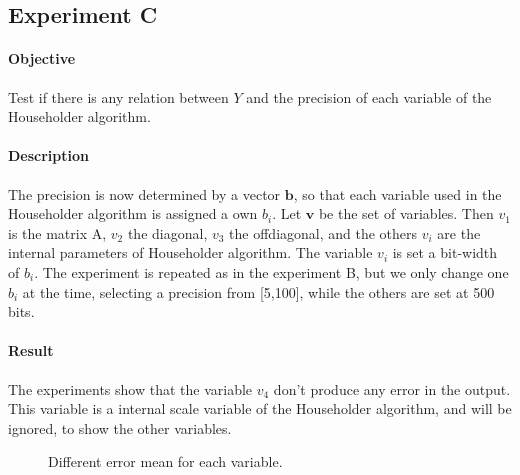 \documentclass[11pt,a4paper]{article}
\newcommand*\V[1]{ \boldsymbol{#1}}
\begin{document}
\newpage
\subsection*{Experiment C}

\paragraph{Objective}
Test if there is any relation between $Y$ and the precision of each variable of 
the Householder algorithm.

\paragraph{Description}
The precision is now determined by a vector $\V b$, so that each variable used 
in the Householder algorithm is assigned a own $b_i$. Let $\V v$ be the set of
variables. Then $v_1$ is the matrix A, $v_2$ the diagonal, $v_3$ the 
offdiagonal, and the others $v_i$ are the internal parameters of Householder 
algorithm. The variable $v_i$ is set a bit-width of $b_i$. The experiment is 
repeated as in the experiment B, but we only change one $b_i$ at the time, 
selecting a precision from [5,100], while the others are set at 500 bits.

\paragraph{Result}
The experiments show that the variable $v_4$ don't produce any error in the 
output. This variable is a internal scale variable of the Householder algorithm, 
and will be ignored, to show the other variables.

\begin{figure}[h]
	\caption{Different error mean for each variable.}
	\label{fig:expC}
\end{figure}
\end{document}
